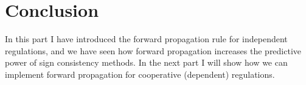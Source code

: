  
\section*{Conclusion} 

In this part I have introduced the forward propagation rule for independent regulations, and
we have seen how forward propagation increases the predictive power of sign consistency methods.
In the next part I will show how we can implement forward propagation for cooperative (dependent) regulations.
